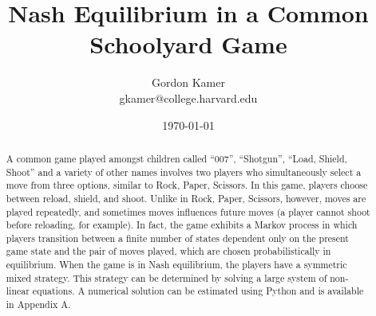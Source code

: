 \documentclass[11pt]{article}
\begin{document}
\title{Nash Equilibrium in a Common Schoolyard Game}
\author{Gordon Kamer
\\
gkamer@college.harvard.edu}
\date{\today}
\maketitle


\begin{abstract}

A common game played amongst children called ``007'', ``Shotgun'', ``Load, Shield, Shoot'' and a variety of other names involves two players who simultaneously select a move from three options, similar to Rock, Paper, Scissors. In this game, players choose between reload, shield, and shoot. Unlike in Rock, Paper, Scissors, however, moves are played repeatedly, and sometimes moves influences future moves (a player cannot shoot before reloading, for example). In fact, the game exhibits a Markov process in which players transition between a finite number of states dependent only on the present game state and the pair of moves played, which are chosen probabilistically in equilibrium. When the game is in Nash equilibrium, the players have a symmetric mixed strategy. This strategy can be determined by solving a large system of non-linear equations. A numerical solution can be estimated using Python and is available in Appendix A.
	
\end{abstract}
\end{document}
